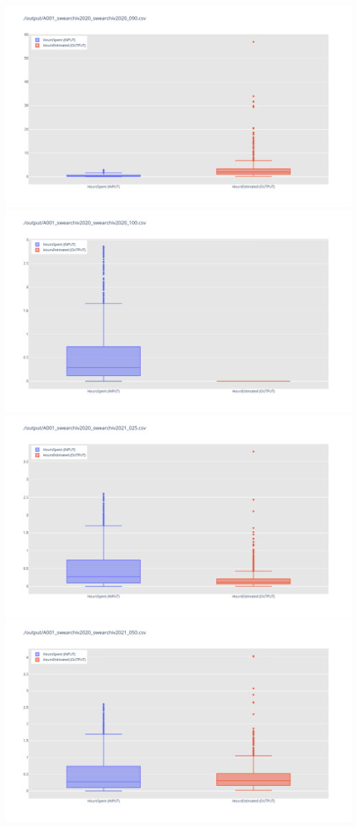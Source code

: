 \includegraphics[width=\textwidth]{Scripts/output/A001_swearchiv2020_swearchiv2020_090.csv.png}
\includegraphics[width=\textwidth]{Scripts/output/A001_swearchiv2020_swearchiv2020_100.csv.png}
\includegraphics[width=\textwidth]{Scripts/output/A001_swearchiv2020_swearchiv2021_025.csv.png}
\includegraphics[width=\textwidth]{Scripts/output/A001_swearchiv2020_swearchiv2021_050.csv.png}
